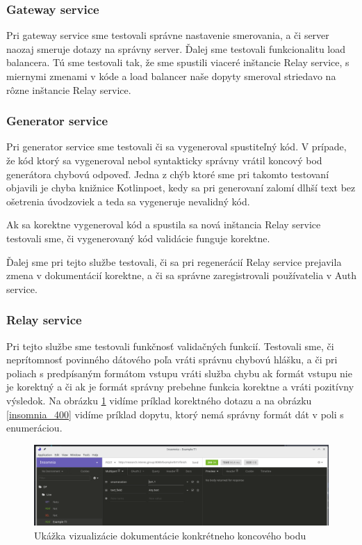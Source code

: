 \subsubsection{Gateway service}
Pri gateway service sme testovali správne nastavenie smerovania, a či server naozaj smeruje dotazy na správny server. Ďalej sme testovali funkcionalitu load balancera. Tú sme testovali tak, že sme spustili viaceré inštancie Relay service, s miernymi zmenami v kóde a load balancer naše dopyty smeroval striedavo na rôzne inštancie Relay service.

\subsubsection{Generator service}
Pri generator service sme testovali či sa vygeneroval spustiteľný kód. V prípade, že kód ktorý sa vygeneroval nebol syntakticky správny vrátil koncový bod generátora chybovú odpoveď. Jedna z chýb ktoré sme pri takomto testovaní objavili je chyba knižnice Kotlinpoet, kedy sa pri generovaní zalomí dlhší text bez ošetrenia úvodzoviek a teda sa vygeneruje nevalidný kód.

Ak sa korektne vygeneroval kód a spustila sa nová inštancia Relay service testovali sme, či vygenerovaný kód validácie funguje korektne.

Ďalej sme pri tejto službe testovali, či sa pri regenerácií Relay service prejavila zmena v dokumentácií korektne, a či sa správne zaregistrovali používatelia v Auth service.

\subsubsection{Relay service}
Pri tejto službe sme testovali funkčnosť validačných funkcií. Testovali sme, či neprítomnosť povinného dátového poľa vráti správnu chybovú hlášku, a či pri poliach s predpísaným formátom vstupu vráti služba chybu ak formát vstupu nie je korektný a či ak je formát správny prebehne funkcia korektne a vráti pozitívny výsledok. Na obrázku \ref{insomnia_200} vidíme príklad korektného dotazu a na obrázku \ref{insomnia_400} vidíme príklad dopytu, ktorý nemá správny formát dát v poli s enumeráciou.

\begin{figure}[!htbp]
	\centering
	\includegraphics[width=16cm]{img/insomnia_200.png}
    \caption{Ukážka vizualizácie dokumentácie konkrétneho koncového bodu}
	\label{insomnia_200}
\end{figure}

